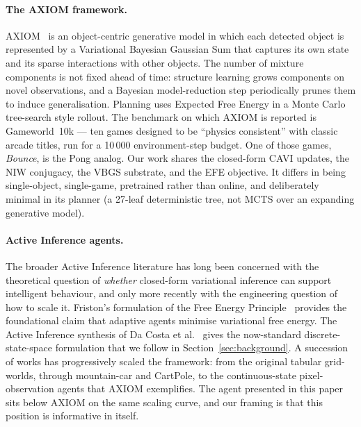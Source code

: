 \documentclass[runningheads]{llncs}
\begin{document}
\paragraph{The AXIOM framework.}
AXIOM~\cite{ref_axiom} is an object-centric generative model in which
each detected object is represented by a Variational Bayesian
Gaussian Sum that captures its own state and its sparse interactions
with other objects. The number of mixture components is not fixed
ahead of time: structure learning grows components on novel
observations, and a Bayesian model-reduction step periodically
prunes them to induce generalisation. Planning uses Expected Free
Energy in a Monte Carlo tree-search style rollout. The benchmark on
which AXIOM is reported is Gameworld~10k --- ten games designed to be
``physics consistent'' with classic arcade titles, run for a 10\,000
environment-step budget. One of those games, \emph{Bounce}, is the
Pong analog. Our work shares the closed-form CAVI updates, the NIW
conjugacy, the VBGS substrate, and the EFE objective. It differs in
being single-object, single-game, pretrained rather than online, and
deliberately minimal in its planner (a 27-leaf deterministic tree,
not MCTS over an expanding generative model).

\paragraph{Active Inference agents.}
The broader Active Inference literature has long been concerned with
the theoretical question of \emph{whether} closed-form variational
inference can support intelligent behaviour, and only more recently
with the engineering question of how to scale it. Friston's
formulation of the Free Energy Principle~\cite{ref_fep} provides the
foundational claim that adaptive agents minimise variational free
energy. The Active Inference synthesis of Da
Costa et al.~\cite{ref_aif_tutorial} gives the now-standard
discrete-state-space formulation that we follow in
Section~\ref{sec:background}. A succession of works has progressively
scaled the framework: from the original tabular grid-worlds, through
mountain-car and CartPole, to the continuous-state pixel-observation
agents that AXIOM exemplifies. The agent presented in this paper
sits below AXIOM on the same scaling curve, and our framing is that
this position is informative in itself.
\end{document}
